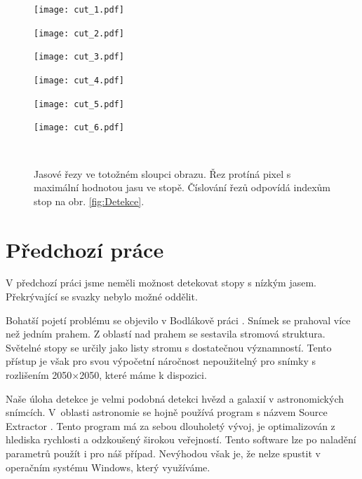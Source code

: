 \newcommand\x{4}
\newcommand\xx{0,155}

\begin{figure}[h!]
    \centering
    \begin{minipage}[c]{0.163\textwidth}
        \centering\texttt{[image: cut\_1.pdf]}
    \end{minipage}
    \begin{minipage}[c]{\xx \textwidth}
        \centering\texttt{[image: cut\_2.pdf]}
    \end{minipage}
    \begin{minipage}[c]{\xx \textwidth}
        \centering\texttt{[image: cut\_3.pdf]}
    \end{minipage}
    \begin{minipage}[c]{\xx \textwidth}
        \centering\texttt{[image: cut\_4.pdf]}
    \end{minipage}
    \begin{minipage}[c]{\xx \textwidth}
        \centering\texttt{[image: cut\_5.pdf]}
    \end{minipage}
    \begin{minipage}[c]{\xx \textwidth}
        \centering\texttt{[image: cut\_6.pdf]}
    \end{minipage}
    \\
        \caption[Jasové řezy.]{Jasové řezy ve totožném sloupci obrazu. Řez protíná pixel s maximální hodnotou jasu ve stopě. Číslování řezů odpovídá indexům stop na obr. \ref{fig:Detekce}.}
        \label{fig:rezy}
\end{figure}


\section{Předchozí práce}

V předchozí práci \cite{Drapela} jsme neměli možnost detekovat stopy s nízkým jasem. Překrývající se svazky nebylo možné oddělit.  

Bohatší pojetí problému se objevilo v Bodlákově práci \cite{Bodlak2005}. Snímek se prahoval více než jedním prahem. Z oblastí nad prahem se sestavila stromová struktura. Světelné stopy se určily jako listy stromu s dostatečnou významností. Tento přístup je však pro svou výpočetní náročnost nepoužitelný pro snímky s rozlišením 2050$\times$2050, které máme k dispozici. 

Naše úloha detekce je velmi podobná detekci hvězd a galaxií v astronomických snímcích. V~oblasti astronomie se hojně používá program s názvem Source Extractor \cite{SEXarticle}. Tento program má za sebou dlouholetý vývoj, je optimalizován z hlediska rychlosti a odzkoušený širokou veřejností. Tento software lze po naladění parametrů použít i pro náš případ. Nevýhodou však je, že nelze spustit v operačním systému Windows, který využíváme.  


